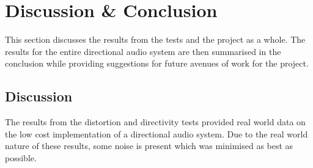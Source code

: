 \section{Discussion \& Conclusion}
This section discusses the results from the tests and the project as a whole. The results for the entire directional audio system are then summarised in the conclusion while providing suggestions for future avenues of work for the project.
\subsection{Discussion}
The results from the distortion and directivity tests provided real world data on the low cost implementation of a directional audio system. Due to the real world nature of these results, some noise is present which was minimised as best as possible.\\
